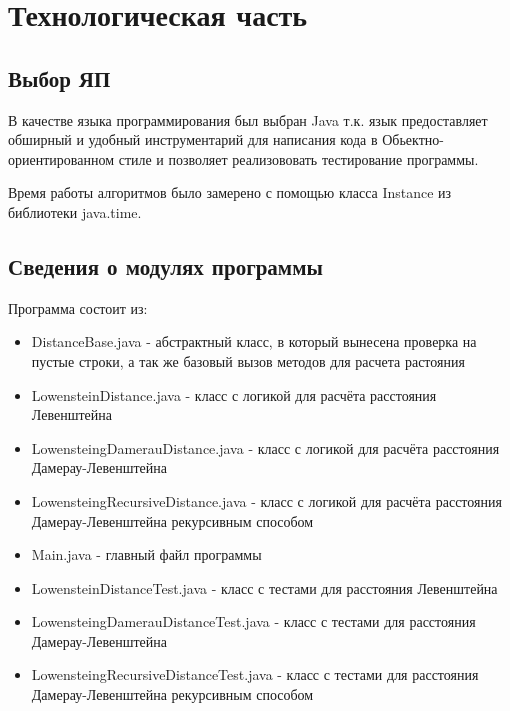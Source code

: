 ﻿\documentclass[12pt]{report}
\begin{document}
\chapter{Технологическая часть}
\section{Выбор ЯП}

В качестве языка программирования был выбран Java т.к. язык предоставляет обширный и удобный инструментарий для написания кода в Обьектно-ориентированном стиле и позволяет реализововать тестирование программы.

Время работы алгоритмов было замерено с помощью класса Instance из библиотеки java.time.

\section{Сведения о модулях программы}
Программа состоит из:
\begin{itemize}
	\item DistanceBase.java - абстрактный класс, в который вынесена проверка на пустые строки, а так же базовый вызов методов для расчета растояния
	\item LowensteinDistance.java - класс с логикой для расчёта расстояния Левенштейна
	\item LowensteingDamerauDistance.java - класс с логикой для расчёта расстояния Дамерау-Левенштейна
	\item LowensteingRecursiveDistance.java - класс с логикой для расчёта расстояния Дамерау-Левенштейна рекурсивным способом
	\item Main.java - главный файл программы
	\item LowensteinDistanceTest.java - класс с тестами для расстояния Левенштейна
	\item LowensteingDamerauDistanceTest.java - класс с тестами для расстояния Дамерау-Левенштейна
	\item LowensteingRecursiveDistanceTest.java - класс с тестами для расстояния Дамерау-Левенштейна рекурсивным способом
\end{itemize}
\end{document}

